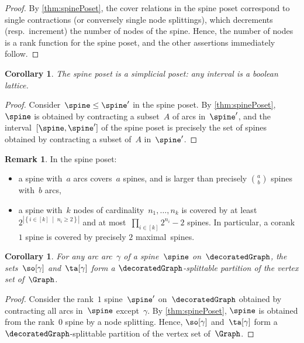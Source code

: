 \documentclass{amsart}
\newtheorem{corollary}[theorem]{Corollary}
\theoremstyle{definition}
\newtheorem{remark}[theorem]{Remark}
\newcommand{\set}[2]{\left\{ #1 \;\middle|\; #2 \right\}} %
\begin{document}
\begin{proof}
  By \cref{thm:spinePoset}, the cover relations in the spine poset correspond to single contractions (or conversely single node splittings), which decrements (resp.~increment) the number of nodes of the spine.
  Hence, the number of nodes is a rank function for the spine poset, and the other assertions immediately follow.
\end{proof}

\begin{corollary}
  \label{coro:simplicialPoset}
  The spine poset is a simplicial poset: any interval is a boolean lattice.
\end{corollary}

\begin{proof}
  Consider~$\spine \le \spine'$ in the spine poset.
  By \cref{thm:spinePoset}, $\spine$ is obtained by contracting a subset~$A$ of arcs in~$\spine'$, and the interval~$[\spine, \spine']$ of the spine poset is precisely the set of spines obtained by contracting a subset of~$A$ in~$\spine'$.
\end{proof}

\begin{remark}
  In the spine poset:
  \begin{itemize}
    \item a spine with~$a$ arcs covers~$a$ spines, and is larger than precisely $\binom{a}{b}$ spines with~$b$ arcs,
    \item a spine with~$k$ nodes of cardinality~$n_1, \dots, n_k$ is covered by at least~$2^{|\set{i \in [k]}{n_i \ge 2}|}$ and at most~$\prod_{i \in [k]} 2^{n_i}-2$ spines. In particular, a corank~$1$ spine is covered by precisely $2$ maximal~spines.
  \end{itemize}
\end{remark}

\begin{corollary}
  \label{coro:splittablePartitions}
  For any arc arc~$\gamma$ of a spine~$\spine$ on~$\decoratedGraph$, the sets~$\so[\gamma]$ and~$\ta[\gamma]$ form a $\decoratedGraph$-splittable partition of the vertex set of~$\Graph$.
\end{corollary}

\begin{proof}
  Consider the rank~$1$ spine~$\spine'$ on~$\decoratedGraph$ obtained by contracting all arcs in~$\spine$ except~$\gamma$. 
  By \cref{thm:spinePoset}, $\spine$ is obtained from the rank~$0$ spine by a node splitting. 
  Hence, $\so[\gamma]$ and~$\ta[\gamma]$ form a $\decoratedGraph$-splittable partition of the vertex set of~$\Graph$.
\end{proof}
\end{document}
